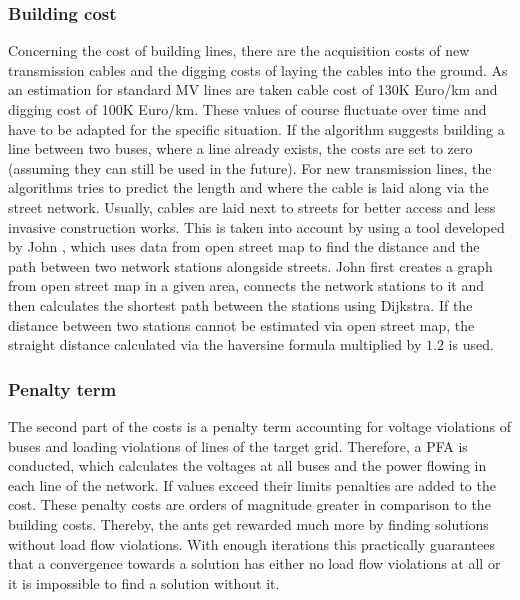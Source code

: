 \subsubsection{Building cost}
Concerning the cost of building lines, there are the acquisition costs of new transmission cables and the digging costs of laying the cables into the ground. As an estimation for standard MV lines are taken cable cost of 130K Euro/km and digging cost of 100K Euro/km. These values of course fluctuate over time and have to be adapted for the specific situation. If the algorithm suggests building a line between two buses, where a line already exists, the costs are set to zero (assuming they can still be used in the future). For new transmission lines, the algorithms tries to predict the length and where the cable is laid along via the street network. Usually, cables are laid next to streets for better access and less invasive construction works. This is taken into account by using a tool developed by John \cite{robert_john}, which uses data from open street map to find the distance and the path between two network stations alongside streets. John first creates a graph from open street map in a given area, connects the network stations to it and then calculates the shortest path between the stations using Dijkstra. If the distance between two stations cannot be estimated via open street map, the straight distance calculated via the haversine formula multiplied by $1.2$ is used.

\subsubsection{Penalty term}
The second part of the costs is a penalty term accounting for voltage violations of buses and loading violations of lines of the target grid. Therefore, a PFA is conducted, which calculates the voltages at all buses and the power flowing in each line of the network. If values exceed their limits penalties are added to the cost. These penalty costs are orders of magnitude greater in comparison to the building costs. Thereby, the ants get rewarded much more by finding solutions without load flow violations. With enough iterations this practically guarantees that a convergence towards a solution has either no load flow violations at all or it is impossible to find a solution without it.


